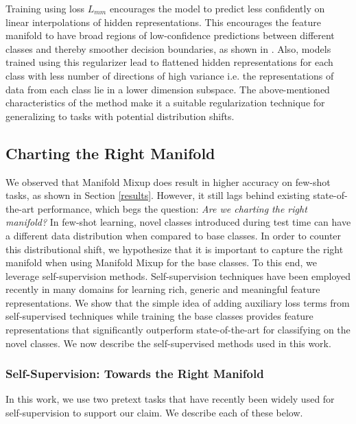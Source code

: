 \documentclass[10pt,twocolumn,letterpaper]{article}
\begin{document}
Training using loss $L_{mm}$ encourages the model to predict less confidently on linear interpolations of hidden representations. This encourages the feature manifold to have broad regions of low-confidence predictions between different classes and thereby smoother decision boundaries, as shown in \cite{verma2019manifold}. Also, models trained using this regularizer lead to flattened hidden representations for each class with less number of directions of high variance i.e. the representations of data from each class lie in a lower dimension subspace. The above-mentioned characteristics of the method make it a suitable regularization technique for generalizing to tasks with potential distribution shifts.



\subsection{Charting the Right Manifold}
We observed that Manifold Mixup does result in higher accuracy on few-shot tasks, as shown in Section \ref{results}. However, it still lags behind existing state-of-the-art performance, which begs the question: \textit{Are we charting the right manifold?} In few-shot learning, novel classes introduced during test time can have a different data distribution when compared to base classes. In order to counter this distributional shift, we hypothesize that it is important to capture the right manifold when using Manifold Mixup for the base classes. To this end, we leverage self-supervision methods.
Self-supervision techniques have been employed recently in many domains for learning rich, generic and meaningful feature representations. We show that the simple idea of adding auxiliary loss terms from self-supervised techniques while training the base classes provides feature representations that significantly outperform state-of-the-art for classifying on the novel classes. We now describe the self-supervised methods used in this work.

\subsubsection{Self-Supervision: Towards the Right Manifold}
\label{selfsupervision}
In this work, we use two pretext tasks that have recently been widely used for self-supervision to support our claim. We describe each of these below.
\end{document}
